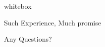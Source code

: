\begin{frame}{
\begin{beamercolorbox}{whitebox}
\begin{center}
Such Experience, Much promise
\end{center}
\end{beamercolorbox}
}


\end{frame}

\begin{frame}{Any Questions?}
\begin{center}
\resizebox{\textwidth}{0.8\textheight}{
\huge \textcolor{lightgray}{42}
}
\end{center}
\end{frame}
